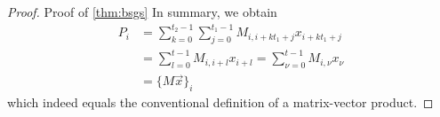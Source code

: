 \begin{proof}{Proof of \autoref{thm:bsgs}}
  In summary, we obtain
  \begin{align*}
    P_i & = \sum_{k=0}^{t_2-1} \sum_{j=0}^{t_1-1} M_{i,i+kt_1+j} x_{i+kt_1+j} \\
        & = \sum_{l=0}^{t-1} M_{i,i+l} x_{i+l}
    = \sum_{\nu=0}^{t-1} M_{i,\nu} x_{\nu}                                    \\
        & = \big\{M \vec{x}\big\}_i
  \end{align*}
  which indeed equals the conventional definition of a matrix-vector product.
\end{proof}
